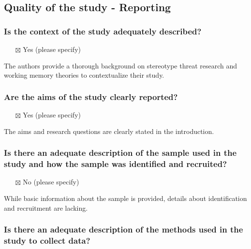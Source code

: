 \documentclass[
  doc, a4paper]{apa7}
\providecommand{\tightlist}{%
  \setlength{\itemsep}{0pt}\setlength{\parskip}{0pt}}
\begin{document}
\subsection{Quality of the study - Reporting}\label{quality-of-the-study---reporting}

\subsubsection{Is the context of the study adequately described?}\label{is-the-context-of-the-study-adequately-described}

\begin{itemize}
\tightlist
\item[$\boxtimes$]
  Yes (please specify)
\end{itemize}

The authors provide a thorough background on stereotype threat research and working memory theories to contextualize their study.

\subsubsection{Are the aims of the study clearly reported?}\label{are-the-aims-of-the-study-clearly-reported}

\begin{itemize}
\tightlist
\item[$\boxtimes$]
  Yes (please specify)
\end{itemize}

The aims and research questions are clearly stated in the introduction.

\subsubsection{Is there an adequate description of the sample used in the study and how the sample was identified and recruited?}\label{is-there-an-adequate-description-of-the-sample-used-in-the-study-and-how-the-sample-was-identified-and-recruited}

\begin{itemize}
\tightlist
\item[$\boxtimes$]
  No (please specify)
\end{itemize}

While basic information about the sample is provided, details about identification and recruitment are lacking.

\subsubsection{Is there an adequate description of the methods used in the study to collect data?}\label{is-there-an-adequate-description-of-the-methods-used-in-the-study-to-collect-data}
\end{document}
